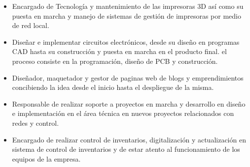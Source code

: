 \documentclass[10pt,a4paper]{altacv}
\begin{document}
\begin{itemize}

\item {}
Encargado de Tecnología y mantenimiento de las impresoras 3D así como su puesta en marcha y manejo de sistemas de gestión de impresoras por medio de red local.\\
\divider

\item {}
Diseñar e implementar circuitos electrónicos, desde su diseño en programas CAD hasta su construcción y puesta en marcha en el producto final. el proceso consiste en la programación, diseño de PCB y construcción. 
\divider

\item {}
Diseñador, maquetador y gestor de paginas web de blogs y emprendimientos concibiendo la idea desde el inicio hasta el despliegue de la misma.\\
\divider

\item {}
Responsable de realizar soporte a proyectos en marcha y desarrollo en diseño e implementación en el área técnica en nuevos proyectos relacionados con redes y control.\\
\divider

\item {}
Encargado de realizar control de inventarios, digitalización y actualización en sistema de control de inventarios y de estar atento al funcionamiento de los equipos de la empresa.
\hspace{40mm}
\end{itemize}
    
\end{document}
